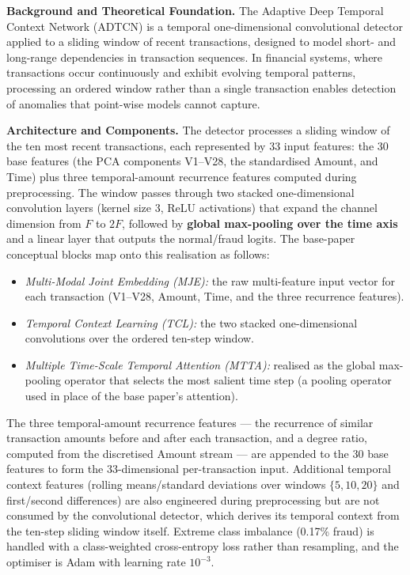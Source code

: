 \textbf{Background and Theoretical Foundation.}
The Adaptive Deep Temporal Context Network (ADTCN) is a temporal one-dimensional convolutional detector applied to a sliding window of recent transactions, designed to model short- and long-range dependencies in transaction sequences. In financial systems, where transactions occur continuously and exhibit evolving temporal patterns, processing an ordered window rather than a single transaction enables detection of anomalies that point-wise models cannot capture.

\textbf{Architecture and Components.}
The detector processes a sliding window of the ten most recent transactions, each represented by 33 input features: the 30 base features (the PCA components V1--V28, the standardised Amount, and Time) plus three temporal-amount recurrence features computed during preprocessing. The window passes through two stacked one-dimensional convolution layers (kernel size 3, ReLU activations) that expand the channel dimension from $F$ to $2F$, followed by \textbf{global max-pooling over the time axis} and a linear layer that outputs the normal/fraud logits. The base-paper conceptual blocks map onto this realisation as follows:
\begin{itemize}
    \item \textit{Multi-Modal Joint Embedding (MJE):} the raw multi-feature input vector for each transaction (V1--V28, Amount, Time, and the three recurrence features).
    \item \textit{Temporal Context Learning (TCL):} the two stacked one-dimensional convolutions over the ordered ten-step window.
    \item \textit{Multiple Time-Scale Temporal Attention (MTTA):} realised as the global max-pooling operator that selects the most salient time step (a pooling operator used in place of the base paper's attention).
\end{itemize}
The three temporal-amount recurrence features --- the recurrence of similar transaction amounts before and after each transaction, and a degree ratio, computed from the discretised Amount stream --- are appended to the 30 base features to form the 33-dimensional per-transaction input. Additional temporal context features (rolling means/standard deviations over windows $\{5,10,20\}$ and first/second differences) are also engineered during preprocessing but are not consumed by the convolutional detector, which derives its temporal context from the ten-step sliding window itself. Extreme class imbalance (0.17\% fraud) is handled with a class-weighted cross-entropy loss rather than resampling, and the optimiser is Adam with learning rate $10^{-3}$.

